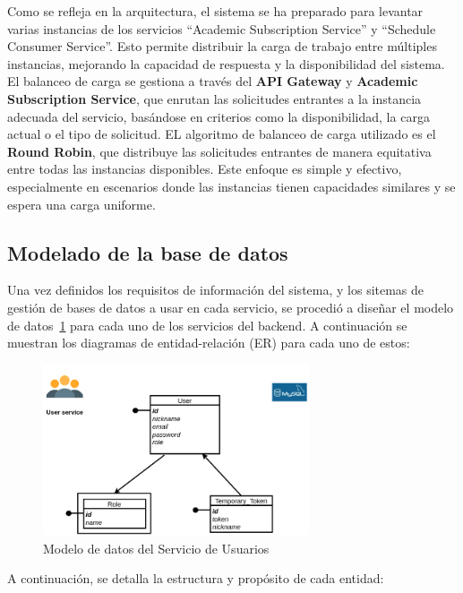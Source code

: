 Como se refleja en la arquitectura, el sistema se ha preparado para levantar varias instancias de los servicios ``Academic Subscription Service'' y ``Schedule Consumer Service''. Esto permite distribuir la carga de trabajo entre múltiples instancias, mejorando la capacidad de respuesta y la disponibilidad del sistema. El balanceo de carga se gestiona a través del \textbf{API Gateway} y \textbf{Academic Subscription Service}, que enrutan las solicitudes entrantes a la instancia adecuada del servicio, basándose en criterios como la disponibilidad, la carga actual o el tipo de solicitud.
\newline\newline
EL algoritmo de balanceo de carga utilizado es el \textbf{Round Robin}, que distribuye las solicitudes entrantes de manera equitativa entre todas las instancias disponibles. Este enfoque es simple y efectivo, especialmente en escenarios donde las instancias tienen capacidades similares y se espera una carga uniforme.

\subsection{Modelado de la base de datos}

Una vez definidos los requisitos de información del sistema, y los sitemas de gestión de bases de datos a usar en cada servicio, se procedió a diseñar el modelo de datos~\ref{fig:user_service_er} para cada uno de los servicios del backend. A continuación se muestran los diagramas de entidad-relación (ER) para cada uno de estos:

\begin{figure}[H]
    \centering
    \includegraphics[width=0.7\textwidth]{figures/06_user_db.png}
    \caption{Modelo de datos del Servicio de Usuarios}
    \label{fig:user_service_er}
\end{figure}

A continuación, se detalla la estructura y propósito de cada entidad:

